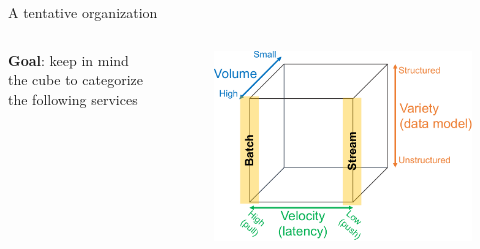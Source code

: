 \begin{frame}[allowframebreaks]{A tentative organization}
\begin{columns}
\begin{column}{0.5\textwidth}
\textbf{Goal}: keep in mind the cube to categorize the following services
\end{column}
\begin{column}{0.5\textwidth}
\begin{figure}
\centering
\includegraphics[scale=.4]{imgs/bigdatacube4.pdf}
\end{figure}
\end{column}
\end{columns}









\end{frame}
